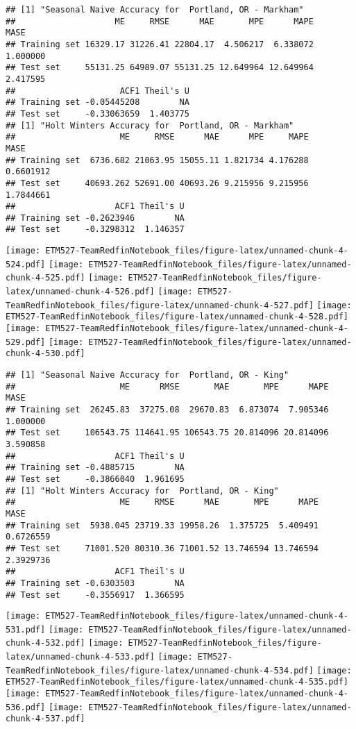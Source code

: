\documentclass[]{article}
\begin{document}
\begin{verbatim}
## [1] "Seasonal Naive Accuracy for  Portland, OR - Markham"
##                    ME     RMSE      MAE       MPE      MAPE     MASE
## Training set 16329.17 31226.41 22804.17  4.506217  6.338072 1.000000
## Test set     55131.25 64989.07 55131.25 12.649964 12.649964 2.417595
##                     ACF1 Theil's U
## Training set -0.05445208        NA
## Test set     -0.33063659  1.403775
## [1] "Holt Winters Accuracy for  Portland, OR - Markham"
##                     ME     RMSE      MAE      MPE     MAPE      MASE
## Training set  6736.682 21063.95 15055.11 1.821734 4.176288 0.6601912
## Test set     40693.262 52691.00 40693.26 9.215956 9.215956 1.7844661
##                    ACF1 Theil's U
## Training set -0.2623946        NA
## Test set     -0.3298312  1.146357
\end{verbatim}

\texttt{[image: ETM527-TeamRedfinNotebook\_files/figure-latex/unnamed-chunk-4-524.pdf]}
\texttt{[image: ETM527-TeamRedfinNotebook\_files/figure-latex/unnamed-chunk-4-525.pdf]}
\texttt{[image: ETM527-TeamRedfinNotebook\_files/figure-latex/unnamed-chunk-4-526.pdf]}
\texttt{[image: ETM527-TeamRedfinNotebook\_files/figure-latex/unnamed-chunk-4-527.pdf]}
\texttt{[image: ETM527-TeamRedfinNotebook\_files/figure-latex/unnamed-chunk-4-528.pdf]}
\texttt{[image: ETM527-TeamRedfinNotebook\_files/figure-latex/unnamed-chunk-4-529.pdf]}
\texttt{[image: ETM527-TeamRedfinNotebook\_files/figure-latex/unnamed-chunk-4-530.pdf]}

\begin{verbatim}
## [1] "Seasonal Naive Accuracy for  Portland, OR - King"
##                     ME      RMSE       MAE       MPE      MAPE     MASE
## Training set  26245.83  37275.08  29670.83  6.873074  7.905346 1.000000
## Test set     106543.75 114641.95 106543.75 20.814096 20.814096 3.590858
##                    ACF1 Theil's U
## Training set -0.4885715        NA
## Test set     -0.3866040  1.961695
## [1] "Holt Winters Accuracy for  Portland, OR - King"
##                     ME     RMSE      MAE       MPE      MAPE      MASE
## Training set  5938.045 23719.33 19958.26  1.375725  5.409491 0.6726559
## Test set     71001.520 80310.36 71001.52 13.746594 13.746594 2.3929736
##                    ACF1 Theil's U
## Training set -0.6303503        NA
## Test set     -0.3556917  1.366595
\end{verbatim}

\texttt{[image: ETM527-TeamRedfinNotebook\_files/figure-latex/unnamed-chunk-4-531.pdf]}
\texttt{[image: ETM527-TeamRedfinNotebook\_files/figure-latex/unnamed-chunk-4-532.pdf]}
\texttt{[image: ETM527-TeamRedfinNotebook\_files/figure-latex/unnamed-chunk-4-533.pdf]}
\texttt{[image: ETM527-TeamRedfinNotebook\_files/figure-latex/unnamed-chunk-4-534.pdf]}
\texttt{[image: ETM527-TeamRedfinNotebook\_files/figure-latex/unnamed-chunk-4-535.pdf]}
\texttt{[image: ETM527-TeamRedfinNotebook\_files/figure-latex/unnamed-chunk-4-536.pdf]}
\texttt{[image: ETM527-TeamRedfinNotebook\_files/figure-latex/unnamed-chunk-4-537.pdf]}
\end{document}
